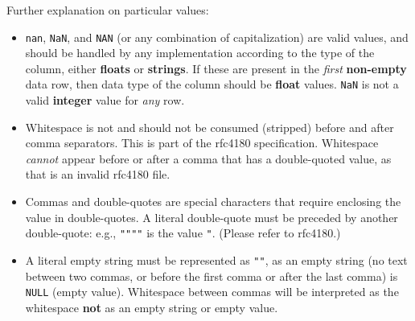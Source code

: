 Further explanation on particular values:
\begin{itemize}
\item \texttt{\small nan}, \texttt{\small NaN}, and \texttt{NAN} (or any
  combination of capitalization) are valid values, and should be handled by any
  implementation according to the type of the column, either \textbf{floats}
  or \textbf{strings}. If these are present in the \textit{first}
  \textbf{non-empty} data row, then data type of the column should be
  \textbf{float} values. \texttt{\small NaN} is not a valid \textbf{integer}
  value for \textit{any} row.
\item Whitespace is not and should not be consumed (stripped) before and after
  comma separators.  This is part of the rfc4180 specification. Whitespace {\em
  cannot} appear before or after a comma that has a double-quoted value, as
  that is an invalid rfc4180 file.
\item Commas and double-quotes are special characters that require 
  enclosing the value in double-quotes. A literal double-quote must be preceded 
  by another double-quote: e.g., \texttt{\small """"} is the value 
  \texttt{\small "}. (Please refer to rfc4180.)
\item A literal empty string must be represented as \texttt{\small ""}, as an 
  empty string (no text between two commas, or before the first comma
  or after the last comma) is \texttt{\small NULL} (empty value). Whitespace
  between commas will be interpreted as the whitespace \textbf{not} as an
  empty string or empty value.
\end{itemize}

